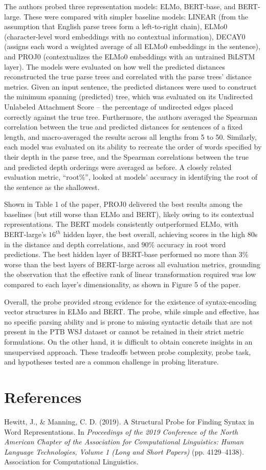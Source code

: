 \documentclass[11pt]{article}
\begin{document}
The authors probed three representation models: 
ELMo, BERT-base, and BERT-large. 
These were compared with simpler baseline 
models: LINEAR (from the assumption
that English parse trees form a left-to-right
chain), ELMo0 (character-level word embeddings with no contextual information), 
DECAY0 (assigns each word a weighted average
of all ELMo0 embeddings in the sentence), 
and PROJ0 (contextualizes the ELMo0 embeddings
with an untrained BiLSTM layer).
The models were evaluated on how well the predicted
distances reconstructed the true parse trees 
and correlated with the parse trees’
distance metrics. Given an input sentence, the predicted distances
were used to construct the minimum spanning (predicted) tree, 
which was evaluated on its Undirected Unlabeled Attachment Score – 
the percentage of undirected edges placed correctly
against the true tree. Furthermore, the authors
averaged the Spearman correlation between 
the true and predicted distances for 
sentences of a fixed length,
and macro-averaged the results
across all lengths from 5 to 50.
Similarly, each model was evaluated
on its ability to recreate the order of words 
specified by their depth in the parse tree,
and the Spearman correlations between
the true and predicted depth orderings
were averaged as before. 
A closely related evaluation metric, ``root\%'',
looked at models’ accuracy in identifying the 
root of the sentence as the shallowest.


Shown in Table 1 of the paper, 
PROJ0 delivered the best results among the baselines (but still worse than ELMo and BERT),
likely owing to its contextual representations.
The BERT models consistently outperformed ELMo, 
with BERT-large's $16^{th}$ hidden layer,
the best overall, achieving scores in the 
high $80$s in the distance and depth correlations, 
and $90\%$ accuracy in root word predictions.
The best hidden layer of BERT-base
performed no more than $3\%$ worse than the best layers of BERT-large
across all evaluation metrics, grounding the observation that the 
effective rank of linear transformation required 
was low compared to each layer's dimensionality, as shown in Figure 5 of the paper.

Overall, the probe provided strong evidence for the existence of
syntax-encoding vector structures in ELMo and BERT. The probe,
while simple and effective, has no specific parsing ability and is prone 
to missing syntactic details that are not present in the PTB WSJ dataset or
cannot be retained in their strict metric formulations. On the other hand, it 
is difficult to obtain concrete insights in an unsupervised approach.
These tradeoffs between probe complexity, probe task, and hypotheses tested
are a common challenge in probing literature.


\section*{References}
Hewitt, J., \& Manning, C. D. (2019). A Structural Probe for Finding Syntax in Word Representations. In \textit{Proceedings of the 2019 Conference of the North American Chapter of the Association for Computational Linguistics: Human Language Technologies, Volume 1 (Long and Short Papers)} (pp. 4129–4138). Association for Computational Linguistics.
\end{document}
